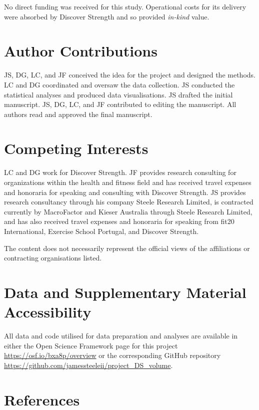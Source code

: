 \documentclass[
]{article}
\begin{document}
No direct funding was received for this study. Operational costs for its
delivery were absorbed by Discover Strength and so provided
\emph{in-kind} value.

\section{Author Contributions}\label{author-contributions}

JS, DG, LC, and JF conceived the idea for the project and designed the
methods. LC and DG coordinated and oversaw the data collection. JS
conducted the statistical analyses and produced data visualisations. JS
drafted the initial manuscript. JS, DG, LC, and JF contributed to
editing the manuscript. All authors read and approved the final
manuscript.

\section{Competing Interests}\label{competing-interests}

LC and DG work for Discover Strength. JF provides research consulting
for organizations within the health and fitness field and has received
travel expenses and honoraria for speaking and consulting with Discover
Strength. JS provides research consultancy through his company Steele
Research Limited, is contracted currently by MacroFactor and Kieser
Australia through Steele Research Limited, and has also received travel
expenses and honoraria for speaking from fit20 International, Exercise
School Portugal, and Discover Strength.

The content does not necessarily represent the official views of the
affiliations or contracting organisations listed.

\section{Data and Supplementary Material
Accessibility}\label{data-and-supplementary-material-accessibility}

All data and code utilised for data preparation and analyses are
available in either the Open Science Framework page for this project
\url{https://osf.io/bxa8p/overview} or the corresponding GitHub
repository \url{https://github.com/jamessteeleii/project_DS_volume}.

\section{References}\label{references}
\end{document}
